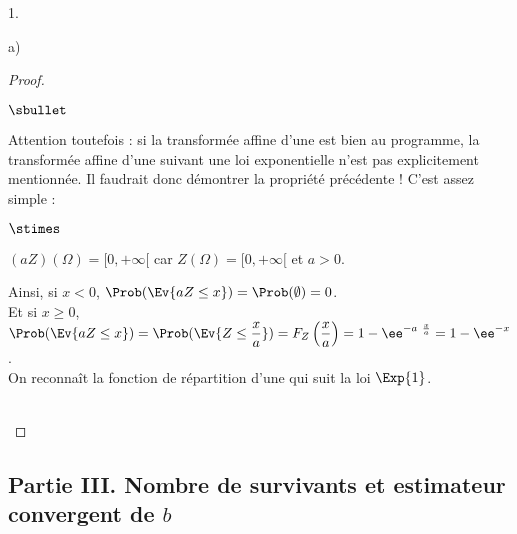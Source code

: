 \begin{noliste}{1.}
\begin{noliste}{a)}
\begin{proof}
\begin{remark}
\begin{noliste}{$\sbullet$}
        \item Attention toutefois : si la transformée affine d'une
          \var est bien au programme, la transformée affine d'une \var
          suivant une loi exponentielle n'est pas explicitement
          mentionnée. Il faudrait donc démontrer la propriété
          précédente ! C'est assez simple :
          \begin{noliste}{$\stimes$}
          \item $(aZ) (\Omega) = [0, +\infty[$ car $Z(\Omega) = [0,
            +\infty[$ et $a > 0$.
          \item Ainsi, si $x < 0$, $\Prob(\Ev{aZ \leq x}) =
            \Prob(\emptyset) = 0$.\\
            Et si $x \geq 0$, $\Prob(\Ev{aZ \leq x}) = \Prob(\Ev{Z
              \leq \dfrac{x}{a}}) = F_Z\left( \dfrac{x}{a} \right) = 1
            - \ee^{- a \ \frac{x}{a}} = 1 - \ee^{-x}$.\\
            On reconnaît la fonction de répartition d'une \var qui
            suit la loi $\Exp{1}$.            
          \end{noliste}
        \end{noliste}
      \end{remark}~\\[-1.4cm]
    \end{proof}
  \end{noliste}
\end{noliste}
  

\newpage


\subsection*{Partie III. Nombre de survivants et estimateur convergent de $b$}

